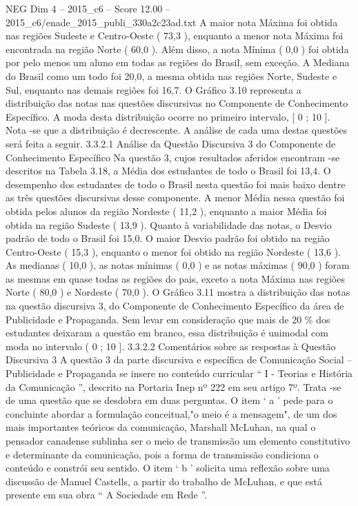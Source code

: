 \begin{textsample}{NEG Dim 4 – 2015\_c6 – Score 12.00 – 2015\_c6/enade\_2015\_publi\_330a2c23ad.txt}
A maior nota Máxima foi obtida nas regiões Sudeste e Centro-Oeste ( 73,3 ), enquanto a menor nota Máxima foi encontrada na região Norte ( 60,0 ).
Além disso, a nota Mínima ( 0,0 ) foi obtida por pelo menos um aluno em todas as regiões do Brasil, sem exceção.
A Mediana do Brasil como um todo foi 20,0, a mesma obtida nas regiões Norte, Sudeste e Sul, enquanto nas demais regiões foi 16,7.
O Gráfico 3.10 representa a distribuição das notas nas questões discursivas no Componente de Conhecimento Específico.
A moda desta distribuição ocorre no primeiro intervalo, [ 0 ; 10 ].
Nota -se que a distribuição é decrescente.
A análise de cada uma destas questões será feita a seguir. 3.3.2.1 Análise da Questão Discursiva 3 do Componente de Conhecimento Específico Na questão 3, cujos resultados aferidos encontram -se descritos na Tabela 3.18, a Média dos estudantes de todo o Brasil foi 13,4.
O desempenho dos estudantes de todo o Brasil nesta questão foi mais baixo dentre as três questões discursivas desse componente.
A menor Média nessa questão foi obtida pelos alunos da região Nordeste ( 11,2 ), enquanto a maior Média foi obtida na região Sudeste ( 13,9 ).
Quanto à variabilidade das notas, o Desvio padrão de todo o Brasil foi 15,0.
O maior Desvio padrão foi obtido na região Centro-Oeste ( 15,3 ), enquanto o menor foi obtido na região Nordeste ( 13,6 ).
As medianas ( 10,0 ), as notas mínimas ( 0,0 ) e as notas máximas ( 90,0 ) foram as mesmas em quase todas as regiões do pais, exceto a nota Máxima nas regiões Norte ( 80,0 ) e Nordeste ( 70,0 ).
O Gráfico 3.11 mostra a distribuição das notas na questão discursiva 3, do Componente de Conhecimento Específico da área de Publicidade e Propaganda.
Sem levar em consideração que mais de 20 \% dos estudantes deixaram a questão em branco, essa distribuição é unimodal com moda no intervalo ( 0 ; 10 ]. 3.3.2.2 Comentários sobre as respostas à Questão Discursiva 3 A questão 3 da parte discursiva e específica de Comunicação Social – Publicidade e Propaganda se insere no conteúdo curricular “ I - Teorias e História da Comunicação ”, descrito na Portaria Inep nº 222 em seu artigo 7º.
Trata -se de uma questão que se desdobra em duas perguntas.
O item ‘ a ’ pede para o concluinte abordar a formulação conceitual,"o meio é a mensagem", de um dos mais importantes teóricos da comunicação, Marshall McLuhan, na qual o pensador canadense sublinha ser o meio de transmissão um elemento constitutivo e determinante da comunicação, pois a forma de transmissão condiciona o conteúdo e constrói seu sentido.
O item ‘ b ’ solicita uma reflexão sobre uma discussão de Manuel Castells, a partir do trabalho de McLuhan, e que está presente em sua obra “ A Sociedade em Rede ”.

\end{textsample}
